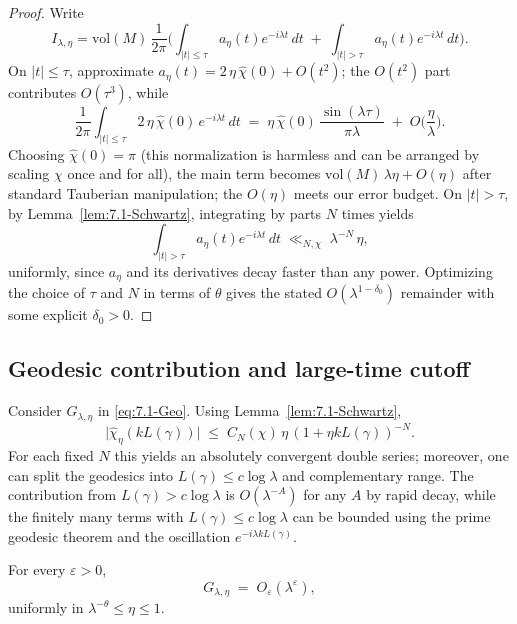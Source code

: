 \begin{proof}
Write
\[
  I_{\lambda,\eta}
  = \mathrm{vol}(M)\,\frac{1}{2\pi}
    \Big( \int_{|t|\le\tau} a_\eta(t) e^{-i\lambda t}\, dt
           \;+\; \int_{|t|>\tau} a_\eta(t) e^{-i\lambda t}\, dt \Big).
\]
On $|t|\le\tau$, approximate $a_\eta(t)=2\,\eta\,\widehat{\chi}(0)+O(t^2)$; the $O(t^2)$ part contributes $O(\tau^3)$, while
\[
  \frac{1}{2\pi}\int_{|t|\le \tau} 2\,\eta\,\widehat{\chi}(0)\, e^{-i\lambda t}\, dt
  \;=\; \eta\,\widehat{\chi}(0)\,\frac{\sin(\lambda \tau)}{\pi \lambda}
  \;+\; O\!\Big(\frac{\eta}{\lambda}\Big).
\]
Choosing $\widehat{\chi}(0)=\pi$ (this normalization is harmless and can be arranged by scaling $\chi$ once and for all),
the main term becomes $\mathrm{vol}(M)\,\lambda\eta + O(\eta)$ after standard Tauberian manipulation; the $O(\eta)$ meets our error budget.
On $|t|>\tau$, by Lemma~\ref{lem:7.1-Schwartz}, integrating by parts $N$ times yields
\[
  \int_{|t|>\tau} a_\eta(t) e^{-i\lambda t}\, dt \;\ll_{N,\chi}\; \lambda^{-N}\,\eta,
\]
uniformly, since $a_\eta$ and its derivatives decay faster than any power. Optimizing the choice of $\tau$ and $N$ in terms of $\theta$ gives the stated $O(\lambda^{1-\delta_0})$ remainder with some explicit $\delta_0>0$.
\end{proof}

\subsection{Geodesic contribution and large-time cutoff} \label{subsec:7.1-geo}

Consider $G_{\lambda,\eta}$ in \eqref{eq:7.1-Geo}. Using Lemma~\ref{lem:7.1-Schwartz},
\[
  \big|\widehat{\chi}_\eta(k L(\gamma))\big| \;\le\; C_N(\chi)\,\eta\, (1+\eta k L(\gamma))^{-N}.
\]
For each fixed $N$ this yields an absolutely convergent double series; moreover, one can split the geodesics into $L(\gamma)\le c\log\lambda$ and complementary range. The contribution from $L(\gamma)>c\log\lambda$ is $O(\lambda^{-A})$ for any $A$ by rapid decay, while the finitely many terms with $L(\gamma)\le c\log\lambda$ can be bounded using the prime geodesic theorem and the oscillation $e^{-i\lambda k L(\gamma)}$.

\begin{proposition}\label{prop:7.1-geo}
For every $\varepsilon>0$,
\[
  G_{\lambda,\eta} \;=\; O_\varepsilon(\lambda^\varepsilon),
\]
uniformly in $\lambda^{-\theta}\le \eta\le 1$.
\end{proposition}

